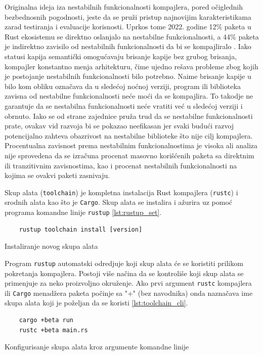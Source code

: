 \documentclass[11pt]{article}
\begin{document}
\newpage

Originalna ideja iza nestabilnih funkcionalnosti kompajlera, pored očiglednih bezbednosnih pogodnosti, 
jeste da se pruži pristup najnovijim karakteristikama zarad testiranja i evaluacije korisnosti.
Uprkos tome 2022. godine 12\%  paketa u Rust ekosistemu se direktno oslanjalo na nestabilne funkcionalnosti, a 
44\% paketa je indirektno zavisilo od nestabilnih funkcionalnosti da bi se kompajliralo \cite{unstable-flags}. Iako 
statusi kapija semantički omogućavaju brisanje kapije bez grubog brisanja, kompajler konstantno menja arhitekturu, čime ujedno 
rešava probleme zbog kojih je postojanje nestabilnih funkcionalnosti bilo potrebno. Naime brisanje kapije 
u bilo kom obliku označava da u sledećoj noćnoj verziji, program ili biblioteka zavisna od nestabilne funkcionalnosti
neće moći da se kompajlira. To takodje ne garantuje da se nestabilna funkcionalnosti neće vratiti već u sledećoj
verziji i obrnuto. Iako se od strane zajednice pruža trud da se nestabilne funkcionalnosti prate, ovakav vid 
razvoja bi se pokazao neefikasan jer svaki budući razvoj potencijalno zahteva obazrivost na nestabilne 
biblioteke što nije cilj kompajlera. Procentualna zavisnost prema nestabilnim funkcionalnostima je visoka ali 
analiza nije sprovedena da se izračuna procenat masovno korišćenih paketa sa direktnim ili tranzitivnim
zavisnostima, kao i procenat nestabilnih funkcionalnosti na kojima se ovakvi paketi zasnivaju.

Skup alata (\verb|toolchain|) je kompletna instalacija Rust kompajlera (\verb|rustc|) i srodnih alata kao što 
je \verb|Cargo|. Skup alata se instalira i ažurira uz pomoć programa komandne linije \verb|rustup| \ref{lst:rustup_set}. 

\begin{listing}[H]
\begin{verbatim}
    rustup toolchain install [version]
\end{verbatim}
\caption{Instaliranje novog skupa alata}
\label{lst:rustup_set}
\end{listing}

Program \verb|rustup| automatski odredjuje koji skup alata će se koristiti prilikom pokretanja kompajlera. 
Postoji više načina da se kontroliše koji skup alata se primenjuje za neko proizvoljno okruženje.
Ako prvi argument \verb|rustc| kompajlera ili \verb|Cargo| menadžera paketa počinje sa "+" (bez navodnika) 
onda naznačava ime skupa alata koji je poželjan da se koristi \ref{lst:toolchain_cli}. 

\begin{listing}[H]
\begin{verbatim}
    cargo +beta run 
    rustc +beta main.rs
\end{verbatim}
\caption{Konfigurisanje skupa alata kroz argumente komandne linije}
\label{lst:toolchain_cli}
\end{listing}
\end{document}
